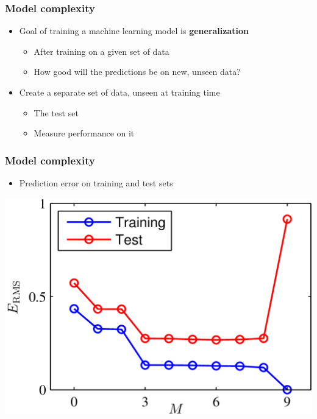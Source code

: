 \documentclass[12pt,notes,mathserif]{beamer}
\begin{document}
\begin{frame}[c]
\frametitle{Model complexity}
\begin{itemize}
\item Goal of training a machine learning model is {\bf generalization}
		\begin{itemize}
		\item After training on a given set of data
		\item How good will the predictions be on new, unseen data?
		\end{itemize}
\item Create a separate set of data, unseen at training time
		\begin{itemize}
		\item  The test set
		\item Measure performance on it
		\end{itemize}
\end{itemize}
\end{frame}

\begin{frame}[c]
\frametitle{Model complexity}
\begin{itemize}
\item  Prediction error on training and test sets
\end{itemize}
\begin{center}
\includegraphics[width=0.61\linewidth]{fig/lec58.jpg}
\end{center}
\end{frame}
\end{document}

